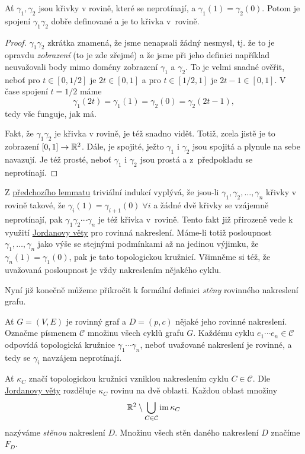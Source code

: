 \begin{lemma}
 \label{lem:spojeni-krivek}
 Ať $\gamma_1,\gamma_2$ jsou křivky v rovině, které se neprotínají, a
 $\gamma_1(1) = \gamma_2(0)$. Potom je spojení $\gamma_1\gamma_2$ dobře
 definované a je to křivka v~rovině.
\end{lemma}
\begin{proof}
  $\gamma_1\gamma_2$ zkrátka znamená, že jsme nenapsali
 žádný nesmysl, tj. že to je opravdu \emph{zobrazení} (to je zde zřejmé) a že
 jsme při jeho definici například neuvažovali body mimo domény zobrazení
 $\gamma_1$ a $\gamma_2$. To je velmi snadné ověřit, neboť pro $t \in [0,1 / 2]$
 je $2t \in [0,1]$ a pro $t \in [1 / 2,1]$ je $2t-1 \in [0,1]$. V čase spojení
 $t = 1 / 2$ máme
 \[
  \gamma_1(2t) = \gamma_1(1) = \gamma_2(0) = \gamma_2(2t - 1),
 \]
 tedy vše funguje, jak má.

 Fakt, že $\gamma_1\gamma_2$ je křivka v rovině, je též snadno vidět. Totiž,
 zcela jistě je to zobrazení $[0,1] \to \mathbb{R}^2$. Dále, je spojité, ježto
 $\gamma_1$ i $\gamma_2$ jsou spojitá a plynule na sebe navazují. Je též prosté,
 neboť $\gamma_1$ i $\gamma_2$ jsou prostá a z~předpokladu se neprotínají.
\end{proof}

Z \hyperref[lem:spojeni-krivek]{předchozího lemmatu} triviální indukcí vyplývá,
že jsou-li $\gamma_1,\gamma_2,\ldots,\gamma_n$ křivky v rovině takové, že
$\gamma_i(1) = \gamma_{i+1}(0) \; \forall i$ a žádné dvě křivky se vzájemně
neprotínají, pak $\gamma_1\gamma_2\cdots \gamma_n$ je též křivka v~rovině. Tento
fakt již přirozeně vede k využití \hyperref[thm:jordanova-o-kruznici]{Jordanovy
věty} pro rovinná nakreslení. Máme-li totiž posloupnost
$\gamma_1,\ldots,\gamma_n$ jako výše se stejnými podmínkami až na jedinou
výjimku, že $\gamma_n(1) = \gamma_1(0)$, pak je tato topologickou kružnicí.
Všimněme si též, že uvažovaná posloupnost je vždy nakreslením nějakého cyklu.

Nyní již konečně můžeme přikročit k formální definici \emph{stěny} rovinného
nakreslení grafu.

\begin{definition}
 \label{def:stena-rovinneho-nakresleni}
 Ať $G = (V,E)$ je rovinný graf a $D = (p,c)$ nějaké jeho rovinné nakreslení.
 Označme písmenem $\mathcal{C}$ množinu všech cyklů grafu $G$. Každému cyklu
 $e_1\cdots e_n \in \mathcal{C}$ odpovídá topologická kružnice $\gamma_1\cdots
 \gamma_n$, neboť uvažované nakreslení je rovinné, a tedy se $\gamma_i$ navzájem
 neprotínají.

 Ať $\kappa_{C}$ značí topologickou kružnici vzniklou nakreslením cyklu $C \in
 \mathcal{C}$. Dle \hyperref[thm:jordanova-o-kruznici]{Jordanovy věty}
 rozděluje $\kappa_{C}$ rovinu na dvě oblasti. Každou oblast množiny
 \[
  \mathbb{R}^2 \setminus \bigcup_{C \in \mathcal{C}} \operatorname{im} \kappa_C
 \]
 nazýváme \emph{stěnou} nakreslení $D$. Množinu všech stěn daného nakreslení $D$
 značíme $F_D$.
\end{definition}

